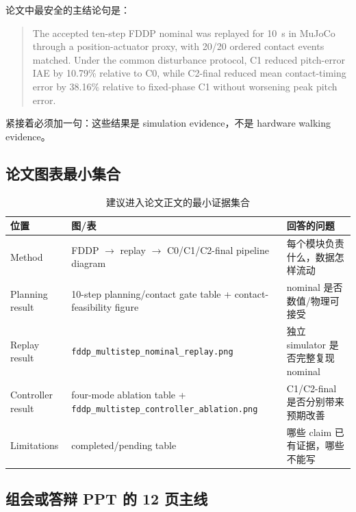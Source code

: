 \documentclass[UTF8,11pt,a4paper]{ctexart}
\newcommand{\code}[1]{\texttt{#1}}
\begin{document}
论文中最安全的主结论句是：
\begin{quote}
The accepted ten-step FDDP nominal was replayed for \SI{10}{s} in MuJoCo through a position-actuator proxy, with 20/20 ordered contact events matched. Under the common disturbance protocol, C1 reduced pitch-error IAE by 10.79\% relative to C0, while C2-final reduced mean contact-timing error by 38.16\% relative to fixed-phase C1 without worsening peak pitch error.
\end{quote}
紧接着必须加一句：这些结果是 simulation evidence，不是 hardware walking evidence。

\subsection{论文图表最小集合}

\begin{table}[htbp]
\centering
\caption{建议进入论文正文的最小证据集合}
\begin{tabularx}{\linewidth}{@{}p{3.1cm}X X@{}}
\toprule
位置 & 图/表 & 回答的问题 \\
\midrule
Method & FDDP $\rightarrow$ replay $\rightarrow$ C0/C1/C2-final pipeline diagram & 每个模块负责什么，数据怎样流动 \\
Planning result & 10-step planning/contact gate table + contact-feasibility figure & nominal 是否数值/物理可接受 \\
Replay result & \code{fddp\_multistep\_nominal\_replay.png} & 独立 simulator 是否完整复现 nominal \\
Controller result & four-mode ablation table + \code{fddp\_multistep\_controller\_ablation.png} & C1/C2-final 是否分别带来预期改善 \\
Limitations & completed/pending table & 哪些 claim 已有证据，哪些不能写 \\
\bottomrule
\end{tabularx}
\end{table}

\subsection{组会或答辩 PPT 的 12 页主线}
\end{document}
